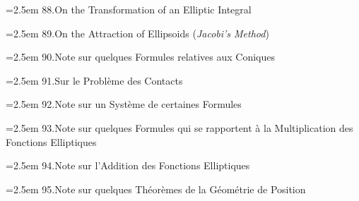 \documentclass[11pt]{article}
\begin{document}
\noindent\hangindent=2.5em
88.\quad On the Transformation of an Elliptic Integral\par
\hspace{1.5em}{\small Camb.\ and Dubl.\ Math.\ Jour.\ t.~v.\ (1850), pp.~204--206}\par

\noindent\hangindent=2.5em
89.\quad On the Attraction of Ellipsoids (\textit{Jacobi's Method})\par
\hspace{1.5em}{\small Camb.\ and Dubl.\ Math.\ Jour.\ t.~v.\ (1850), pp.~217--226}\par

\noindent\hangindent=2.5em
90.\quad Note sur quelques Formules relatives aux Coniques\par
\hspace{1.5em}{\small Crelle, t.~xxxix.\ (1850), pp.~1--3}\par

\noindent\hangindent=2.5em
91.\quad Sur le Probl\`eme des Contacts\par
\hspace{1.5em}{\small Crelle, t.~xxxix.\ (1850), pp.~4--13}\par

\bigskip

\noindent\hangindent=2.5em
92.\quad Note sur un Syst\`eme de certaines Formules\par
\hspace{1.5em}{\small Crelle, t.~xxxix.\ (1850), pp.~14, 15}\par

\noindent\hangindent=2.5em
93.\quad Note sur quelques Formules qui se rapportent \`a la Multiplication des Fonctions Elliptiques\par
\hspace{1.5em}{\small Crelle, t.~xxxix.\ (1850), pp.~16--22}\par

\noindent\hangindent=2.5em
94.\quad Note sur l'Addition des Fonctions Elliptiques\par
\hspace{1.5em}{\small Crelle, t.~xli.\ (1851), pp.~57--65}\par

\noindent\hangindent=2.5em
95.\quad Note sur quelques Th\'eor\`emes de la G\'eom\'etrie de Position\par
\hspace{1.5em}{\small Crelle, t.~xli.\ (1851), pp.~66--72}\par
\end{document}
